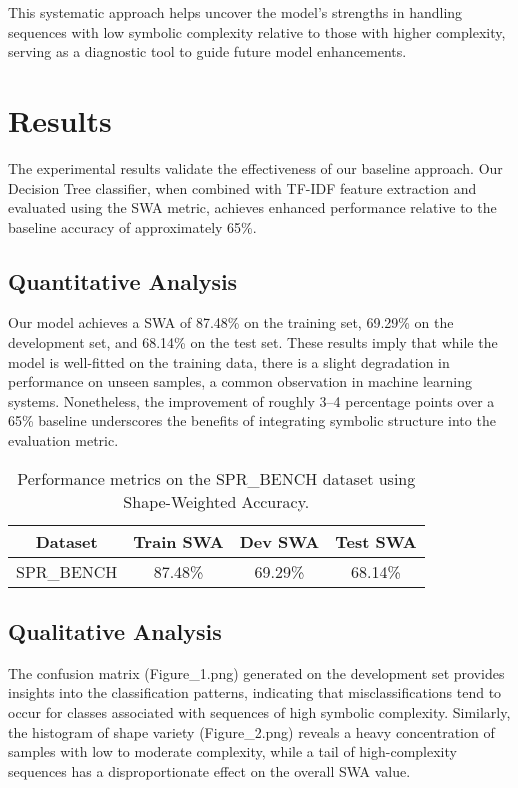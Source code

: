 \documentclass{article}
\begin{document}
This systematic approach helps uncover the model’s strengths in handling sequences with low symbolic complexity relative to those with higher complexity, serving as a diagnostic tool to guide future model enhancements.

\section{Results}
The experimental results validate the effectiveness of our baseline approach. Our Decision Tree classifier, when combined with TF-IDF feature extraction and evaluated using the SWA metric, achieves enhanced performance relative to the baseline accuracy of approximately 65\%.

\subsection{Quantitative Analysis}
Our model achieves a SWA of 87.48\% on the training set, 69.29\% on the development set, and 68.14\% on the test set. These results imply that while the model is well-fitted on the training data, there is a slight degradation in performance on unseen samples, a common observation in machine learning systems. Nonetheless, the improvement of roughly 3–4 percentage points over a 65\% baseline underscores the benefits of integrating symbolic structure into the evaluation metric.

\begin{table}[h]
\centering
\begin{tabular}{|c|c|c|c|}
\hline
\textbf{Dataset} & \textbf{Train SWA} & \textbf{Dev SWA} & \textbf{Test SWA} \\
\hline
SPR\_BENCH & 87.48\% & 69.29\% & 68.14\% \\
\hline
\end{tabular}
\caption{Performance metrics on the SPR\_BENCH dataset using Shape-Weighted Accuracy.}
\label{tab:results}
\end{table}

\subsection{Qualitative Analysis}
The confusion matrix (Figure\_1.png) generated on the development set provides insights into the classification patterns, indicating that misclassifications tend to occur for classes associated with sequences of high symbolic complexity. Similarly, the histogram of shape variety (Figure\_2.png) reveals a heavy concentration of samples with low to moderate complexity, while a tail of high-complexity sequences has a disproportionate effect on the overall SWA value.
\end{document}
